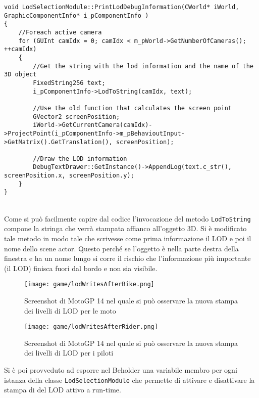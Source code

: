 \begin{lstlisting}[style=maurizio-code, caption=Metodo per la stampa del LOD corrente, label={code:printloddebuginformation}]
void LodSelectionModule::PrintLodDebugInformation(CWorld* iWorld, GraphicComponentInfo* i_pComponentInfo )
{
	//Foreach active camera
	for (GUInt camIdx = 0; camIdx < m_pWorld->GetNumberOfCameras(); ++camIdx)
	{
		//Get the string with the lod information and the name of the 3D object
		FixedString256 text;
		i_pComponentInfo->LodToString(camIdx, text);
		
		//Use the old function that calculates the screen point
		GVector2 screenPosition;
		iWorld->GetCurrentCamera(camIdx)->ProjectPoint(i_pComponentInfo->m_pBehavioutInput->GetMatrix().GetTranslation(), screenPosition);
		
		//Draw the LOD information
		DebugTextDrawer::GetInstance()->AppendLog(text.c_str(), screenPosition.x, screenPosition.y);
	}
}
\end{lstlisting}
~\\
Come si può facilmente capire dal codice l'invocazione del metodo \texttt{LodToString} compone la stringa che verrà stampata affianco all'oggetto 3D. Si è modificato tale metodo in modo tale che scrivesse come prima informazione il LOD e poi il nome dello scene actor. Questo perché se l'oggetto è nella parte destra della finestra e ha un nome lungo si corre il rischio che l'informazione più importante (il LOD) finisca fuori dal bordo e non sia visibile.

\begin{figure}[h!] 
	\centering 
	\hspace*{-0.05\columnwidth}\texttt{[image: game/lodWritesAfterBike.png]} 
	\caption{Screenshot di MotoGP 14 nel quale si può osservare la nuova stampa dei livelli di LOD per le moto}
\end{figure}

\begin{figure}[h!] 
	\centering 
	\hspace*{-0.05\columnwidth}\texttt{[image: game/lodWritesAfterRider.png]} 
	\caption{Screenshot di MotoGP 14 nel quale si può osservare la nuova stampa dei livelli di LOD per i piloti}
\end{figure}

Si è poi provveduto ad esporre nel Beholder una variabile membro per ogni istanza della classe \texttt{LodSelectionModule} che permette di attivare e disattivare la stampa di del LOD attivo a run-time.\\

